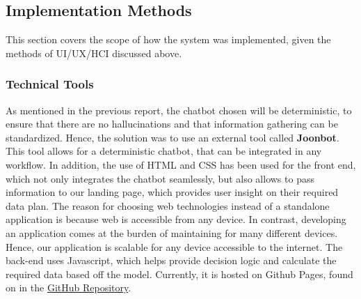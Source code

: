 \documentclass[conference]{IEEEtran}
\begin{document}
\subsection{Implementation Methods}
This section covers the scope of how the system was implemented, given the methods of UI/UX/HCI discussed above. 
\subsubsection{Technical Tools}
As mentioned in the previous report, the chatbot chosen will be deterministic, to ensure that there are no hallucinations and that information gathering can be standardized. Hence, the solution was to use an external tool called \textbf{Joonbot}. This tool allows for a deterministic chatbot, that can be integrated in any workflow. In addition, the use of HTML and CSS has been used for the front end, which not only integrates the chatbot seamlessly, but also allows to pass information to our landing page, which provides user insight on their required data plan. The reason for choosing web technologies instead of a standalone application is because web is accessible from any device. In contrast, developing an application comes at the burden of maintaining for many different devices. Hence, our application is scalable for any device accessible to the internet. The back-end uses Javascript, which helps provide decision logic and calculate the required data based off the model. Currently, it is hosted on Github Pages, found on in the \href{https://github.com/briantkatch/357-my-little-chomsky}{GitHub Repository}.
\end{document}

